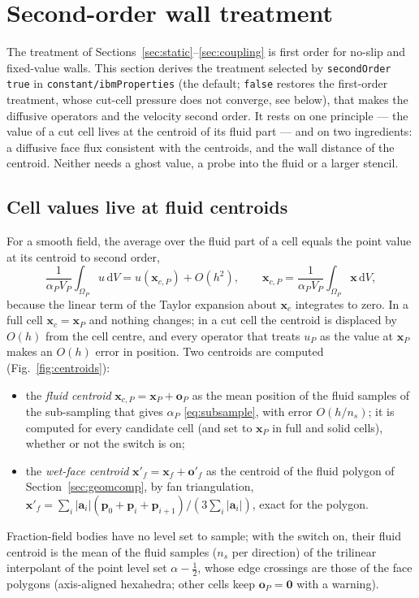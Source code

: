 \documentclass[11pt,a4paper]{article}
\theoremstyle{remark}
\newcommand{\xx}{\bm{x}}
\newcommand{\dd}{\,\mathrm{d}}
\newcommand{\code}[1]{\texttt{#1}}
\begin{document}
\section{Second-order wall treatment}
\label{sec:secondorder}

The treatment of Sections~\ref{sec:static}--\ref{sec:coupling} is first order for no-slip and
fixed-value walls. This section derives the treatment selected by \code{secondOrder true} in
\code{constant/ibmProperties} (the default; \code{false} restores the first-order treatment, whose
cut-cell pressure does not converge, see below), that makes the diffusive operators
and the velocity second order. It rests on one principle --- the value of a cut cell lives at
the centroid of its fluid part --- and on two ingredients: a diffusive face flux consistent
with the centroids, and the wall distance of the centroid. Neither needs a ghost value, a
probe into the fluid or a larger stencil.

\subsection{Cell values live at fluid centroids}
\label{sec:centroids}

For a smooth field, the average over the fluid part of a cell equals the point value at its
centroid to second order,
\begin{equation}
\frac{1}{\alpha_PV_P}\int_{\Omega_P}u\dd V=u(\xx_{c,P})+O(h^2),\qquad
\xx_{c,P}=\frac{1}{\alpha_PV_P}\int_{\Omega_P}\xx\dd V ,
\end{equation}
because the linear term of the Taylor expansion about $\xx_c$ integrates to zero. In a full
cell $\xx_c=\xx_P$ and nothing changes; in a cut cell the centroid is displaced by $O(h)$
from the cell centre, and every operator that treats $u_P$ as the value at $\xx_P$ makes an
$O(h)$ error in position. Two centroids are computed (Fig.~\ref{fig:centroids}):
\begin{itemize}\itemsep2pt
\item the \emph{fluid centroid} $\xx_{c,P}=\xx_P+\bm o_P$ as the mean position of the fluid
      samples of the sub-sampling that gives $\alpha_P$ \eqref{eq:subsample}, with error
      $O(h/n_s)$; it is computed for every candidate cell (and set to $\xx_P$ in full and solid
      cells), whether or not the switch is on;
\item the \emph{wet-face centroid} $\xx'_f=\xx_f+\bm o'_f$ as the centroid of the fluid polygon
      of Section~\ref{sec:geomcomp}, by fan triangulation, $\xx'_f=\sum_i|\bm a_i|(\bm p_0+\bm
      p_i+\bm p_{i+1})/(3\sum_i|\bm a_i|)$, exact for the polygon.
\end{itemize}
Fraction-field bodies have no level set to sample; with the switch on, their fluid centroid is
the mean of the fluid samples ($n_s$ per direction) of the trilinear interpolant of the point
level set $\alpha-\tfrac12$, whose edge crossings are those of the face polygons
(axis-aligned hexahedra; other cells keep $\bm o_P=\bm 0$ with a warning).
\end{document}
